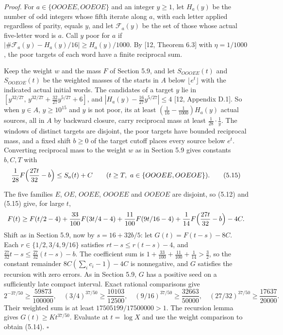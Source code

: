 \documentclass[11pt,a4paper]{article}
\begin{document}
\emph{Proof.} For \(a\in\{OOOEE,OOEOE\}\) and an integer \(y\ge1\), let
\(H_a(y)\) be the number of odd integers whose fifth iterate along
\(a\), with each letter applied regardless of parity, equals \(y\), and
let \(\mathcal F_a(y)\) be the set of those whose actual five-letter
word is \(a\). Call \(y\) poor for \(a\) if
\(|\#\mathcal F_a(y)-H_a(y)/16|\ge H_a(y)/1000\). By {[}12, Theorem
6.3{]} with \(\eta=1/1000\), the poor targets of each word have a finite
reciprocal sum.

Keep the weight \(w\) and the mass \(F\) of Section 5.9, and let
\(S_{OOOEE}(t)\) and \(S_{OOEOE}(t)\) be the weighted masses of the
starts in \(A\) below \(\lfloor e^t\rfloor\) with the indicated actual
initial words. The candidates of a target \(y\) lie in
\([y^{32/27},\,y^{32/27}+\tfrac{32}{27}y^{5/27}+6]\), and
\(|H_a(y)-\tfrac{16}{27}y^{5/27}|\le4\) {[}12, Appendix D.1{]}. So when
\(y\in A\), \(y\ge10^{15}\) and \(y\) is not poor, its at least
\((\tfrac1{16}-\tfrac1{1000})H_a(y)\) actual sources, all in \(A\) by
backward closure, carry reciprocal mass at least
\(\tfrac1{28}\cdot\tfrac1y\). The windows of distinct targets are
disjoint, the poor targets have bounded reciprocal mass, and a fixed
shift \(b\ge0\) of the target cutoff places every source below \(e^t\).
Converting reciprocal mass to the weight \(w\) as in Section 5.9 gives
constants \(b,C,T\) with \[
\frac1{28}F\Bigl(\frac{27t}{32}-b\Bigr)\le S_a(t)+C
\qquad(t\ge T,\ a\in\{OOOEE,OOEOE\}).
\tag{5.15}
\]

The five families \(E\), \(OE\), \(OOEE\), \(OOOEE\) and \(OOEOE\) are
disjoint, so (5.12) and (5.15) give, for large \(t\), \[
F(t)\ge F(t/2-4)+\frac{33}{100}F(3t/4-4)
+\frac{11}{100}F(9t/16-4)+\frac1{14}F\Bigl(\frac{27t}{32}-b\Bigr)-4C .
\] Shift as in Section 5.9, now by \(s=16+32b/5\): let
\(G(t)=F(t-s)-8C\). Each \(r\in\{1/2,3/4,9/16\}\) satisfies
\(rt-s\le r(t-s)-4\), and \(\tfrac{27}{32}t-s\le\tfrac{27}{32}(t-s)-b\).
The coefficient sum is
\(1+\tfrac{33}{100}+\tfrac{11}{100}+\tfrac1{14}>\tfrac32\), so the
constant remainder \(8C(\sum_ic_i-1)-4C\) is nonnegative, and \(G\)
satisfies the recursion with zero errors. As in Section 5.9, \(G\) has a
positive seed on a sufficiently late compact interval. Exact rational
comparisons give \[
2^{-37/50}\ge\frac{59873}{100000},\quad
(3/4)^{37/50}\ge\frac{10103}{12500},\quad
(9/16)^{37/50}\ge\frac{32663}{50000},\quad
(27/32)^{37/50}\ge\frac{17637}{20000}.
\] Their weighted sum is at least \(17505199/17500000>1\). The recursion
lemma gives \(G(t)\ge Kt^{37/50}\). Evaluate at \(t=\log X\) and use the
weight comparison to obtain (5.14). \(\square\)
\end{document}

